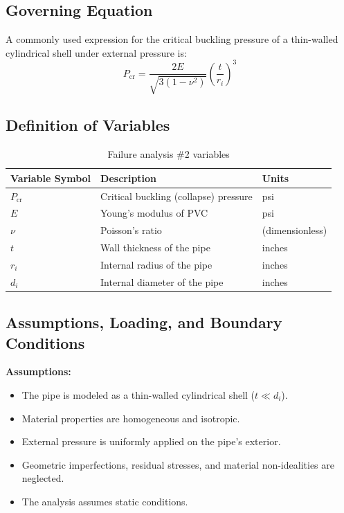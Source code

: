 \documentclass[12pt]{report}
\begin{document}
\subsection{Governing Equation}
A commonly used expression for the critical buckling pressure of a thin-walled cylindrical shell under external pressure is:
\begin{equation}
    P_{\text{cr}} = \frac{2E}{\sqrt{3(1-\nu^2)}} \left(\frac{t}{r_i}\right)^3
    \tag{1}
\end{equation}

\subsection{Definition of Variables}

\begin{table}[ht]
\centering
\caption{Failure analysis \#2 variables}
\begin{tabular}{|>{\raggedright}p{2cm}|>{\raggedright}p{6cm}|>{\raggedright\arraybackslash}p{3cm}|}
\hline
\textbf{Variable Symbol} & \textbf{Description} & \textbf{Units} \\
\hline
\(P_{\text{cr}}\) & Critical buckling (collapse) pressure & psi \\
\hline
\(E\) & Young's modulus of PVC & psi \\
\hline
\(\nu\) & Poisson's ratio & (dimensionless) \\
\hline
\(t\) & Wall thickness of the pipe & inches \\
\hline
\(r_i\) & Internal radius of the pipe & inches \\
\hline
\(d_i\) & Internal diameter of the pipe & inches \\
\hline
\end{tabular}
\end{table}

\subsection{Assumptions, Loading, and Boundary Conditions}
\textbf{Assumptions:}
\begin{itemize}
    \item The pipe is modeled as a thin-walled cylindrical shell (\(t \ll d_i\)).
    \item Material properties are homogeneous and isotropic.
    \item External pressure is uniformly applied on the pipe's exterior.
    \item Geometric imperfections, residual stresses, and material non-idealities are neglected.
    \item The analysis assumes static conditions.
\end{itemize}
\end{document}
